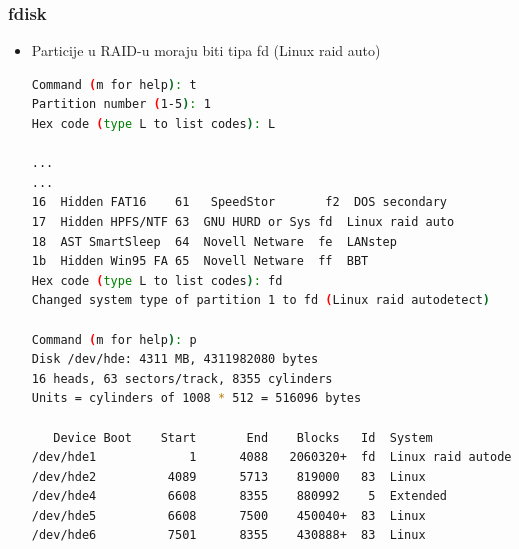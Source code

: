 \documentclass[croatian,t]{beamer} %
\begin{document}
    \begin{frame}[fragile]
	\frametitle{fdisk}
		\begin{itemize}
			\item Particije u RAID-u moraju biti tipa fd (Linux raid auto)
			\begin{lstlisting}[basicstyle={\tiny\ttfamily},language=bash]
Command (m for help): t
Partition number (1-5): 1
Hex code (type L to list codes): L

...
...
16  Hidden FAT16    61   SpeedStor       f2  DOS secondary
17  Hidden HPFS/NTF 63  GNU HURD or Sys fd  Linux raid auto
18  AST SmartSleep  64  Novell Netware  fe  LANstep
1b  Hidden Win95 FA 65  Novell Netware  ff  BBT
Hex code (type L to list codes): fd
Changed system type of partition 1 to fd (Linux raid autodetect)

Command (m for help): p
Disk /dev/hde: 4311 MB, 4311982080 bytes
16 heads, 63 sectors/track, 8355 cylinders
Units = cylinders of 1008 * 512 = 516096 bytes

   Device Boot    Start       End    Blocks   Id  System
/dev/hde1             1      4088   2060320+  fd  Linux raid autodetect
/dev/hde2          4089      5713    819000   83  Linux
/dev/hde4          6608      8355    880992    5  Extended
/dev/hde5          6608      7500    450040+  83  Linux
/dev/hde6          7501      8355    430888+  83  Linux
			\end{lstlisting}
		\end{itemize}
	\end{frame}  
    
\end{document}
